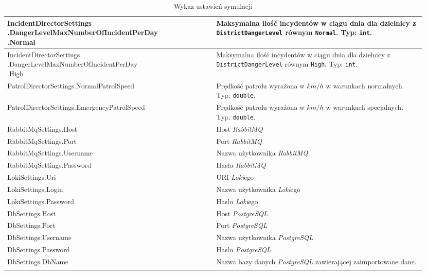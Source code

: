\begin{longtable}{|p{0.5\linewidth} | p{0.5\linewidth}|}
     \makecell[tl]{IncidentDirectorSettings\\.DangerLevelMaxNumberOfIncidentPerDay\\.Normal} & Maksymalna ilość incydentów w ciągu dnia dla dzielnicy z \texttt{DistrictDangerLevel} równym \texttt{Normal}. Typ: \texttt{int}. \\ 
     \hline
     \makecell[tl]{IncidentDirectorSettings\\.DangerLevelMaxNumberOfIncidentPerDay\\.High} & Maksymalna ilość incydentów w ciągu dnia dla dzielnicy z \texttt{DistrictDangerLevel} równym \texttt{High}. Typ: \texttt{int}. \\ 
     \hline
     PatrolDirectorSettings.NormalPatrolSpeed & Prędkość patrolu wyrażona w $km/h$ w warunkach normalnych. Typ: \texttt{double}. \\ 
     \hline
     PatrolDirectorSettings.EmergencyPatrolSpeed & Prędkość patrolu wyrażona w $km/h$ w warunkach specjalnych. Typ: \texttt{double}. \\ 
     \hline 
     RabbitMqSettings.Host & Host \emph{RabbitMQ} \\ 
     \hline 
     RabbitMqSettings.Port & Port \emph{RabbitMQ} \\ 
     \hline 
     RabbitMqSettings.Username & Nazwa użytkownika \emph{RabbitMQ} \\ 
     \hline 
     RabbitMqSettings.Password & Hasło \emph{RabbitMQ} \\ 
     \hline 
     LokiSettings.Uri & URI \emph{Loki}ego \\ 
     \hline 
     LokiSettings.Login & Nazwa użytkownika \emph{Loki}ego \\ 
     \hline
     LokiSettings.Password & Hasło \emph{Loki}ego \\ 
     \hline
     DbSettings.Host & Host \emph{PostgreSQL} \\ 
     \hline
     DbSettings.Port & Port \emph{PostgreSQL} \\ 
     \hline
     DbSettings.Username & Nazwa użytkownika \emph{PostgreSQL} \\ 
     \hline
     DbSettings.Password & Hasło \emph{PostgreSQL} \\ 
     \hline
     DbSettings.DbName & Nazwa bazy danych \emph{PostgreSQL} zawierającej zaimportowane dane. \\ 
     \hline
\caption{Wykaz ustawień symulacji}
\label{tab:configurationSimulationSettings}
\end{longtable}


